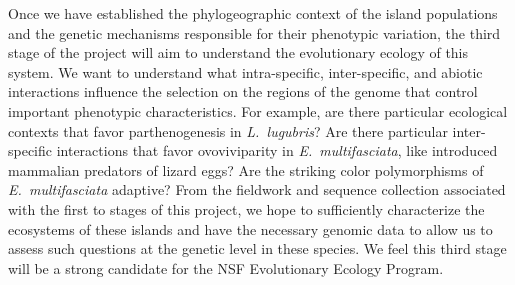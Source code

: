 \documentclass[10pt]{article}
\begin{document}
Once we have established the phylogeographic context of the island populations and the genetic mechanisms responsible for their phenotypic variation, the third stage of the project will aim to understand the evolutionary ecology of this system.
We want to understand what intra-specific, inter-specific, and abiotic interactions influence the selection on the regions of the genome that control important phenotypic characteristics.
For example, are there particular ecological contexts that favor parthenogenesis in \emph{L.\ lugubris}?
Are there particular inter-specific interactions that favor ovoviviparity in \emph{E.\ multifasciata}, like introduced mammalian predators of lizard eggs?
Are the striking color polymorphisms of \emph{E.\ multifasciata} adaptive?
From the fieldwork and sequence collection associated with the first to stages of this project, we hope to sufficiently characterize the ecosystems of these islands and have the necessary genomic data to allow us to assess such questions at the genetic level in these species.
We feel this third stage will be a strong candidate for the NSF Evolutionary Ecology Program.
\end{document}
